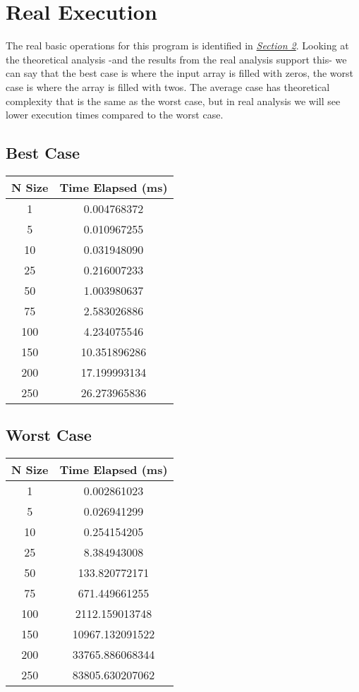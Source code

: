 \documentclass[10pt]{article}
\begin{document}
\newpage
\section{Real Execution}
The real basic operations for this program is identified in \hyperref[sec:ident]{\textit{Section 2}}. Looking at the theoretical analysis -and the results from the real analysis support this- we can say that the best case is where the input array is filled with zeros, the worst case is where the array is filled with twos. The average case has theoretical complexity that is the same as the worst case, but in real analysis we will see lower execution times compared to the worst case. 

\subsection{Best Case}
\begin{center}
\begin{tabular}{|c|c|} 
 \hline
 N Size & Time Elapsed (ms) \\ 
 \hline
 1 & 0.004768372 \\
 \hline
 5 & 0.010967255 \\
 \hline
 10 & 0.031948090 \\
 \hline
 25 & 0.216007233 \\
 \hline
 50 & 1.003980637 \\
 \hline
 75 & 2.583026886 \\
 \hline
 100 & 4.234075546 \\
 \hline
 150 & 10.351896286 \\
 \hline
 200 & 17.199993134 \\
 \hline
 250 & 26.273965836 \\
 \hline
\end{tabular}
\end{center}


\subsection{Worst Case}
\begin{center}
\begin{tabular}{|c|c|} 
 \hline
 N Size & Time Elapsed (ms) \\ 
 \hline
 1 & 0.002861023 \\
 \hline
 5 & 0.026941299 \\
 \hline
 10 & 0.254154205 \\
 \hline
 25 & 8.384943008 \\
 \hline
 50 & 133.820772171 \\
 \hline
 75 & 671.449661255 \\
 \hline
 100 & 2112.159013748 \\
 \hline
 150 & 10967.132091522 \\
 \hline
 200 & 33765.886068344 \\
 \hline
 250 & 83805.630207062 \\
 \hline
\end{tabular}
\end{center}
\end{document}
